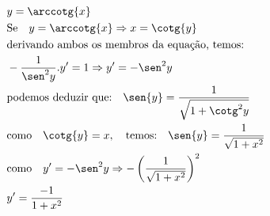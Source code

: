 \begin{ex}
\begin{align}
&y=\arccotg{x}\nonumber\\
&\text{Se}\quad y=\arccotg{x} \Rightarrow x= \cotg{y}\nonumber\\
&\text{derivando ambos os membros da equação, temos:}\nonumber\\
&-\frac{1}{\sen^2{y}}.y'=1 \Rightarrow y'=-\sen^2{y}\nonumber\\
&\text{podemos deduzir que:}\quad \sen{y}=\frac{1}{\sqrt{1+\cotg^2{y}}}\nonumber\\
&\text{como}\quad \cotg{y}=x, \quad \text{temos:}\quad \sen{y}=\frac{1}{\sqrt{1+x^2}}\nonumber\\
&\text{como} \quad y'=-\sen^2{y} \Rightarrow -\left(\frac{1}{\sqrt{1+x^2}}\right)^2\nonumber\\
&y'=\frac{-1}{1+x^2}\nonumber
\end{align}
\end{ex}

